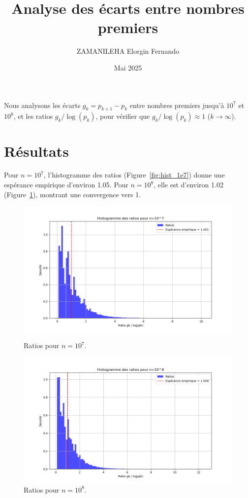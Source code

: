 \documentclass[a4paper,12pt]{article}
\title{Analyse des écarts entre nombres premiers}
\author{ZAMANILEHA Elorgin Fernando}
\date{Mai 2025}
\begin{document}
	
	\maketitle
	
	Nous analysons les écarts \( g_k = p_{k+1} - p_k \) entre nombres premiers jusqu'à \( 10^7 \) et \( 10^8 \), et les ratios \( g_k / \log(p_k) \), pour vérifier que \( g_k / \log(p_k) \approx 1 \) (\( k \to \infty \)).
	
	\section{Résultats}
	Pour \( n = 10^7 \), l'histogramme des ratios (Figure~\ref{fig:hist_1e7}) donne une espérance empirique d'environ 1.05. Pour \( n = 10^8 \), elle est d'environ 1.02 (Figure~\ref{fig:hist_1e8}), montrant une convergence vers 1.
	
	\begin{figure}[h]
		\centering
		\begin{minipage}{0.48\textwidth}
			\centering
			\includegraphics[width=\textwidth]{histogram_1e7.png}
			\caption{Ratios pour \( n = 10^7 \).}
			\label{fig:hist_1e7}
		\end{minipage}\hfill
		\begin{minipage}{0.48\textwidth}
			\centering
			\includegraphics[width=\textwidth]{histogram_1e8.png}
			\caption{Ratios pour \( n = 10^8 \).}
			\label{fig:hist_1e8}
		\end{minipage}
	\end{figure}
	
\end{document}

